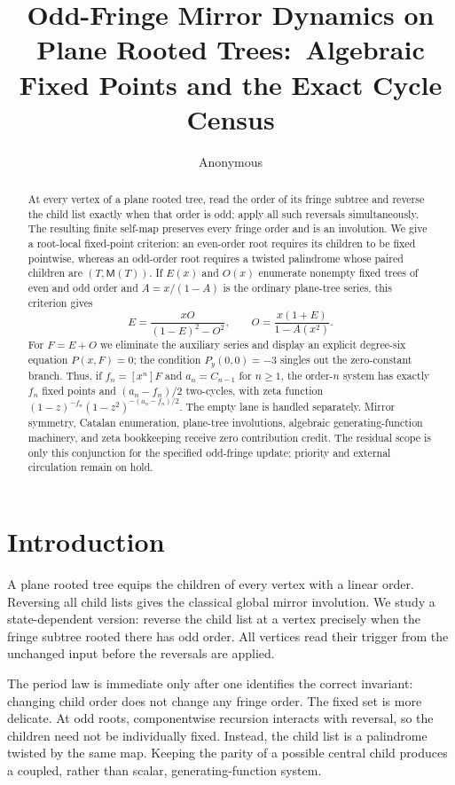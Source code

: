 \documentclass[10pt,a4paper]{amsart}
\title[Odd-fringe mirror dynamics]{Odd-Fringe Mirror Dynamics on Plane Rooted Trees:\
Algebraic Fixed Points and the Exact Cycle Census}
\author{Anonymous}
\date{}
\theoremstyle{definition}
\theoremstyle{remark}
\newcommand{\M}{\mathsf M}
\begin{document}
\begin{abstract}
At every vertex of a plane rooted tree, read the order of its fringe subtree
and reverse the child list exactly when that order is odd; apply all such
reversals simultaneously.  The resulting finite self-map preserves every
fringe order and is an involution.  We give a root-local fixed-point
criterion: an even-order root requires its children to be fixed pointwise,
whereas an odd-order root requires a twisted palindrome whose paired
children are $(T,\M(T))$.  If $E(x)$ and $O(x)$ enumerate nonempty fixed
trees of even and odd order and
$A=x/(1-A)$ is the ordinary plane-tree series, this criterion gives
\[
 E=\frac{xO}{(1-E)^2-O^2},\qquad
 O=\frac{x(1+E)}{1-A(x^2)}.
\]
For $F=E+O$ we eliminate the auxiliary series and display an explicit
degree-six equation $P(x,F)=0$; the condition $P_y(0,0)=-3$ singles out the
zero-constant branch.  Thus, if $f_n=[x^n]F$ and
$a_n=C_{n-1}$ for $n\geq1$, the order-$n$ system has exactly $f_n$ fixed
points and $(a_n-f_n)/2$ two-cycles, with zeta function
$(1-z)^{-f_n}(1-z^2)^{-(a_n-f_n)/2}$.  The empty lane is handled separately.
Mirror symmetry, Catalan enumeration, plane-tree involutions, algebraic
generating-function machinery, and zeta bookkeeping receive zero
contribution credit.  The residual scope is only this conjunction for the
specified odd-fringe update; priority and external circulation remain on
hold.
\end{abstract}

\maketitle

\section{Introduction}

A plane rooted tree equips the children of every vertex with a linear
order.  Reversing all child lists gives the classical global mirror
involution.  We study a state-dependent version: reverse the child list at a
vertex precisely when the fringe subtree rooted there has odd order.  All
vertices read their trigger from the unchanged input before the reversals are
applied.

The period law is immediate only after one identifies the correct invariant:
changing child order does not change any fringe order.  The fixed set is more
delicate.  At odd roots, componentwise recursion interacts with reversal, so
the children need not be individually fixed.  Instead, the child list is a
palindrome twisted by the same map.  Keeping the parity of a possible central
child produces a coupled, rather than scalar, generating-function system.
\end{document}
